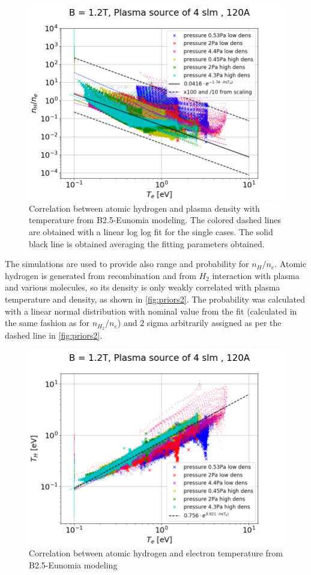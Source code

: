 \begin{figure}[!ht]
	\centering
	\includegraphics[width=0.7\linewidth,trim={0 0 30 45},clip]{Chapters/chapter3/figs/nH_ne3.png}
	\caption{Correlation between atomic hydrogen and plasma density with temperature from B2.5-Eunomia modeling. The colored dashed lines are obtained with a linear log log fit for the single cases. The solid black line is obtained averaging the fitting parameters obtained.}
	\label{fig:priors2}
\end{figure}

The simulations are used to provide also range and probability for $n_H/n_e$. Atomic hydrogen is generated from recombination and from $H_2$ interaction with plasma and various molecules, so its density is only weakly correlated with plasma temperature and density, as shown in \autoref{fig:priors2}. 
The probability was calculated with a linear normal distribution with nominal value from the fit (calculated in the same fashion as for $n_{H_2}/n_e$) and 2 sigma arbitrarily assigned as per the dashed line in \autoref{fig:priors2}.

\begin{figure}[!ht]
	\centering
	\includegraphics[width=0.7\linewidth,trim={0 0 30 45},clip]{Chapters/chapter3/figs/TH_Te3.png}
	\caption{Correlation between atomic hydrogen and electron temperature from B2.5-Eunomia modeling}
	\label{fig:priors3}
\end{figure}

